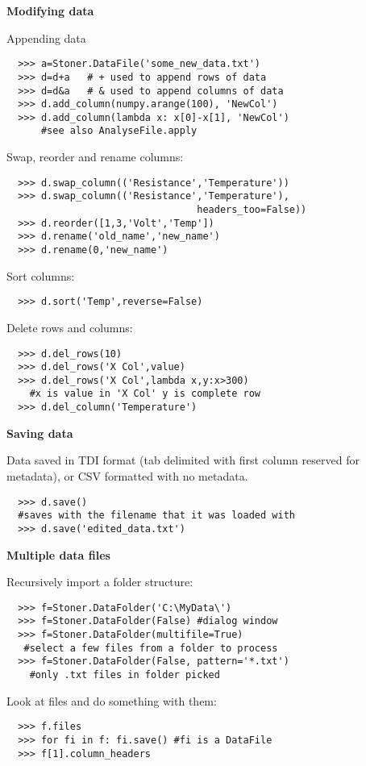 \documentclass[a4paper,9pt,threecolumn,landscape]{scrartcl}
\begin{document}
\begin{multicols}{3}
\vspace{0.2cm}
\textbf {Modifying data}
\vspace{0.2cm}\normalfont

Appending data
\begin{verbatim}
  >>> a=Stoner.DataFile('some_new_data.txt')
  >>> d=d+a   # + used to append rows of data
  >>> d=d&a   # & used to append columns of data
  >>> d.add_column(numpy.arange(100), 'NewCol')
  >>> d.add_column(lambda x: x[0]-x[1], 'NewCol')
      #see also AnalyseFile.apply
\end{verbatim}
\vspace{0cm}

Swap, reorder and rename columns:
\begin{verbatim}
  >>> d.swap_column(('Resistance','Temperature'))
  >>> d.swap_column(('Resistance','Temperature'),
                                 headers_too=False))
  >>> d.reorder([1,3,'Volt','Temp'])
  >>> d.rename('old_name','new_name')
  >>> d.rename(0,'new_name')
\end{verbatim}

Sort columns:
\begin{verbatim}
  >>> d.sort('Temp',reverse=False)
\end{verbatim}

Delete rows and columns:
\begin{verbatim}
  >>> d.del_rows(10)
  >>> d.del_rows('X Col',value)
  >>> d.del_rows('X Col',lambda x,y:x>300)
   	#x is value in 'X Col' y is complete row
  >>> d.del_column('Temperature')
\end{verbatim}

\vspace{0.5cm}
\textbf {Saving data}
\vspace{0.2cm}\normalfont

Data saved in TDI format (tab delimited with first column reserved for metadata), or CSV formatted with no metadata.
\begin{verbatim}
  >>> d.save() 
  #saves with the filename that it was loaded with
  >>> d.save('edited_data.txt')
\end{verbatim}

\vspace{0.2cm}
\textbf {Multiple data files}
\vspace{0.2cm}\normalfont

Recursively import a folder structure:
\begin{verbatim}
  >>> f=Stoner.DataFolder('C:\MyData\')
  >>> f=Stoner.DataFolder(False) #dialog window
  >>> f=Stoner.DataFolder(multifile=True)
   #select a few files from a folder to process
  >>> f=Stoner.DataFolder(False, pattern='*.txt')
  	#only .txt files in folder picked
\end{verbatim}
Look at files and do something with them:
\begin{verbatim}
  >>> f.files
  >>> for fi in f: fi.save() #fi is a DataFile
  >>> f[1].column_headers
\end{verbatim}


\end{multicols}
\end{document}

